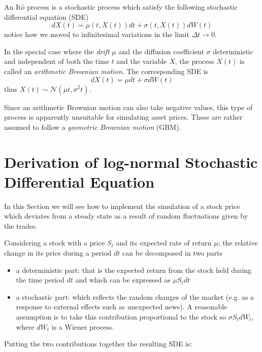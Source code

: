 An It$\hat{o}$ process is a stochastic process which satisfy the following stochastic
differential equation (SDE) 
\begin{equation}
dX(t) = \mu(t, X(t)) dt + \sigma(t, X(t)) dW(t)
\end{equation}
notice how we moved to infinitesimal variations in the limit $\Delta t\rightarrow 0$.

In the special case where the \emph{drift} $\mu$ and the diffusion coefficient $\sigma$ 
deterministic and independent of both the time $t$ and the variable $X$, the process $X(t)$ is called an \emph{arithmetic Brownian motion}. The corresponding SDE is
\begin{equation}
dX(t) = \mu dt + \sigma dW(t)
\end{equation}
thus $X(t) ∼ \mathcal{N}(\mu t, \sigma^2 t)$.

Since an arithmetic Brownian motion can also take
negative values, this type of process is apparently unsuitable for
simulating asset prices. These are rather assumed to follow a \emph{geometric
Brownian motion} (GBM). 

\section{Derivation of log-normal Stochastic Differential Equation}
\label{derivation-of-log-normal-stochastic-differential-equation}

In this Section we will see how to implement the simulation of a stock price 
which deviates from a steady state as a result of random fluctuations given by the trades. 

Considering a stock with a price \(S_t\) and its expected rate of return \(\mu\); the relative change in its price during a period \(dt\) can be decomposed in two parts

\begin{itemize}
	\tightlist
	\item
	a deterministic part: that is the expected return from the stock held
	during the time period \(dt\) and which can be expressed as \(\mu S_tdt\)
	\item
	a stochastic part: which reflects the random changes of the market
	(e.g. as a response to external effects such as unexpected news). A
	reasonable assumption is to take this contribution proportional to the
	stock so \(\sigma S_t dW_t\), where \(dW_t\) is a Wiener process.
\end{itemize}
Putting the two contributions together the resulting SDE is:

